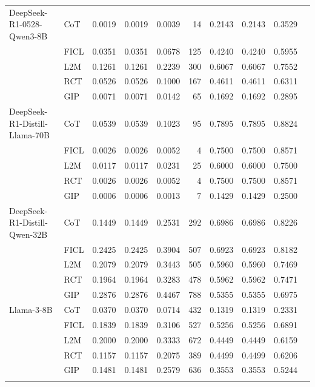 \documentclass[conference]{IEEEtran}
\begin{document}
\begin{longtable}{p{3.5cm} l r r r r r r r r}
  \bottomrule
DeepSeek-R1-0528-Qwen3-8B & CoT  & 0.0019 & 0.0019 & 0.0039 & 14 & 0.2143 & 0.2143 & 0.3529 \\
                          & FICL & 0.0351 & 0.0351 & 0.0678 & 125 & 0.4240 & 0.4240 & 0.5955 \\
                          & L2M  & 0.1261 & 0.1261 & 0.2239 & 300 & 0.6067 & 0.6067 & 0.7552 \\
                          & RCT  & 0.0526 & 0.0526 & 0.1000 & 167 & 0.4611 & 0.4611 & 0.6311 \\
                          & GIP  & 0.0071 & 0.0071 & 0.0142 & 65 & 0.1692 & 0.1692 & 0.2895 \\ \addlinespace
DeepSeek-R1-Distill-Llama-70B & CoT  & 0.0539 & 0.0539 & 0.1023 & 95 & 0.7895 & 0.7895 & 0.8824 \\
                          & FICL & 0.0026 & 0.0026 & 0.0052 & 4 & 0.7500 & 0.7500 & 0.8571 \\
                          & L2M  & 0.0117 & 0.0117 & 0.0231 & 25 & 0.6000 & 0.6000 & 0.7500 \\
                          & RCT  & 0.0026 & 0.0026 & 0.0052 & 4 & 0.7500 & 0.7500 & 0.8571 \\
                          & GIP  & 0.0006 & 0.0006 & 0.0013 & 7 & 0.1429 & 0.1429 & 0.2500 \\ \addlinespace
DeepSeek-R1-Distill-Qwen-32B & CoT  & 0.1449 & 0.1449 & 0.2531 & 292 & 0.6986 & 0.6986 & 0.8226 \\
                          & FICL & 0.2425 & 0.2425 & 0.3904 & 507 & 0.6923 & 0.6923 & 0.8182 \\
                          & L2M  & 0.2079 & 0.2079 & 0.3443 & 505 & 0.5960 & 0.5960 & 0.7469 \\
                          & RCT  & 0.1964 & 0.1964 & 0.3283 & 478 & 0.5962 & 0.5962 & 0.7471 \\
                          & GIP  & 0.2876 & 0.2876 & 0.4467 & 788 & 0.5355 & 0.5355 & 0.6975 \\ \addlinespace
Llama-3-8B & CoT  & 0.0370 & 0.0370 & 0.0714 & 432 & 0.1319 & 0.1319 & 0.2331 \\
           & FICL & 0.1839 & 0.1839 & 0.3106 & 527 & 0.5256 & 0.5256 & 0.6891 \\
           & L2M  & 0.2000 & 0.2000 & 0.3333 & 672 & 0.4449 & 0.4449 & 0.6159 \\
           & RCT  & 0.1157 & 0.1157 & 0.2075 & 389 & 0.4499 & 0.4499 & 0.6206 \\
           & GIP  & 0.1481 & 0.1481 & 0.2579 & 636 & 0.3553 & 0.3553 & 0.5244 \\ \addlinespace

\end{longtable}
\end{document}

